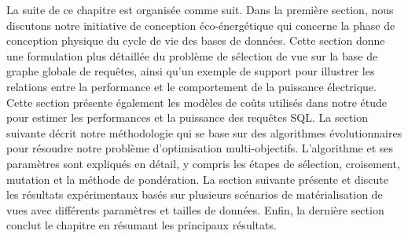 La suite de ce chapitre est organisée comme suit. Dans la première section, nous discutons notre initiative de conception éco-énergétique qui concerne la phase de conception physique du cycle de vie des bases de données. Cette section donne une formulation plus détaillée du problème de sélection de vue sur la base de graphe globale de requêtes, ainsi qu'un exemple de support pour illustrer les relations entre la performance et le comportement de la puissance électrique. Cette section présente également les modèles de coûts utilisés dans notre étude pour estimer les performances et la puissance des requêtes SQL. La section suivante décrit notre méthodologie qui se base sur des algorithmes évolutionnaires pour résoudre notre problème d'optimisation multi-objectifs. L'algorithme et ses paramètres sont expliqués en détail, y compris les étapes de sélection, croisement, mutation et la méthode de pondération. La section suivante présente et discute les résultats expérimentaux basés sur plusieurs scénarios de matérialisation de vues avec différents paramètres et tailles de données. Enfin, la dernière section conclut le chapitre en résumant les principaux résultats.


